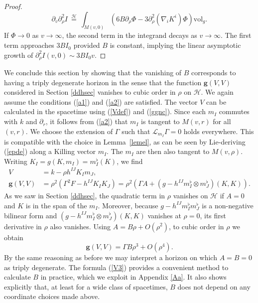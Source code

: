 \documentclass[11pt, reqno]{amsart}
\theoremstyle{plain}
\theoremstyle{definition}
\numberwithin{equation}{section}
\begin{document}
\begin{proof}
    \begin{equation}
        \partial_v\partial_\rho^2I \:\overset{\mathcal{H}}{=}\:  \int_{M(v,0)}\left(6B \partial_\rho \Phi -3 \partial_\rho^2(\nabla_i K^i)\Phi\right)\text{vol}_g.
   \end{equation}
    If $\Phi \to 0$ as $v \to \infty$, the second term in the integrand decays as $v \to \infty$. The first term approaches $3BI_0$ provided $B$ is constant, implying the linear asymptotic growth of $\partial_\rho^2 I(v,0) \sim 3BI_0v$.
\end{proof}

We conclude this section by showing that the vanishing of $B$ corresponds to having a triply degenerate horizon in the sense that the function $\textbf{g}(V,V)$ considered in Section \ref{ddhsec} vanishes to cubic order in $\rho$ on $\mathcal{H}$. We again assume the conditions (\ref{a1}) and (\ref{a2}) are satisfied.  
The vector $V$ can be calculated in the spacetime using (\ref{Vdef}) and (\ref{ggnc}). Since each $m_I$ commutes with $k$ and $\partial_r$, it follows from (\ref{a2}) that $m_I$ is tangent to $M(v,r)$ for all $(v,r)$. We choose the extension of $\Gamma$ such that $\mathcal{L}_{m_I}\Gamma = 0$ holds everywhere. This is compatible with the choice in Lemma~\ref{lemel}, as can be seen by Lie-deriving (\ref{epde}) along a Killing vector $m_I$. The $m_I$ are then also tangent to $M(v,\rho)$. Writing $K_I = g(K,m_I) = m_I^\flat(K)$, we find
\begin{subequations}
\begin{align}
    V &= k - \rho h^{IJ}K_Im_J,\\
    \textbf{g}(V,V) &= \rho^2(\Gamma^2 F- h^{IJ}K_IK_J) = \rho^2\left(\Gamma A+ (g - h^{IJ}m_I^\flat \otimes m_J^\flat)(K,K)\right). \label{gvv}
\end{align}
\end{subequations}
As we saw in Section \ref{ddhsec}, the quadratic term in $\rho$ vanishes on $\mathcal{H}$ if $A = 0$ and $K$ is in the span of the $m_I$. Moreover, because $g - h^{IJ}m^\flat_Im^\flat_J$ is a non-negative bilinear form and $(g - h^{IJ}m_I^\flat \otimes m_J^\flat)(K,K)$ vanishes at $\rho = 0$, its first derivative in $\rho$ also vanishes. Using $A = B\rho + O(\rho^2)$, to cubic order in $\rho$ we obtain
\begin{equation} \label{V3}
    \textbf{g}(V,V) = \Gamma B\rho^3 + O(\rho^4).
\end{equation}
By the same reasoning as before we may interpret a horizon on which $A = B = 0$ as triply degenerate. The formula (\ref{V3}) provides a convenient method to calculate $B$ in practice, which we exploit in Appendix \ref{Aa}. It also shows explicitly that, at least for a wide class of spacetimes, $B$ does not depend on any coordinate choices made above. 
\end{document}
